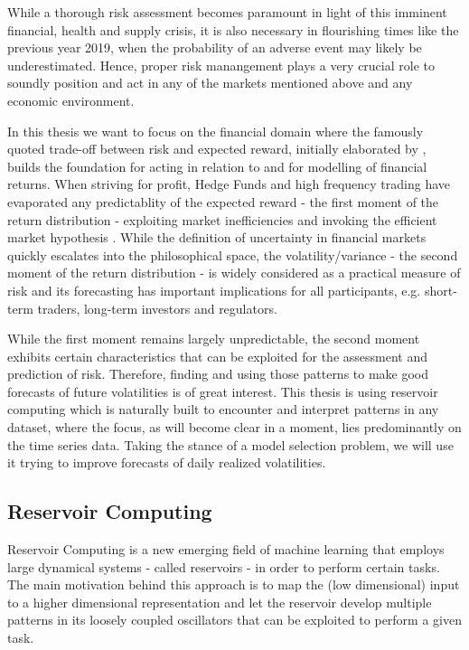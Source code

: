 While a thorough risk assessment becomes paramount in light of this imminent financial, health and supply crisis, it is also necessary in flourishing times like the previous year 2019, when the probability of an adverse event may likely be underestimated. Hence, proper risk manangement plays a very crucial role to soundly position and act in any of the markets mentioned above and any economic environment.

In this thesis we want to focus on the financial domain where the famously quoted trade-off between risk and expected reward, initially elaborated by \cite{Markowitz1952}, builds the foundation for acting in relation to and for modelling of financial returns. When striving for profit, Hedge Funds and high frequency trading have evaporated any predictablity of the expected reward - the first moment of the return distribution - exploiting market inefficiencies and invoking the efficient market hypothesis \citep{Fama1970}. While the definition of uncertainty in financial markets quickly escalates into the philosophical space, the volatility/variance - the second moment of the return distribution - is widely considered as a practical measure of risk and its forecasting has important implications for all participants, e.g. short-term traders, long-term investors and regulators. 

While the first moment remains largely unpredictable, the second moment exhibits certain characteristics that can be exploited for the assessment and prediction of risk. Therefore, finding and using those patterns to make good forecasts of future volatilities is of great interest. This thesis is using reservoir computing which is naturally built to encounter and interpret patterns in any dataset, where the focus, as will become clear in a moment, lies predominantly on the time series data. Taking the stance of a model selection problem, we will use it trying to improve forecasts of daily realized volatilities.


\subsection{Reservoir Computing}

Reservoir Computing is a new emerging field of machine learning that employs large dynamical systems - called reservoirs - in order to perform certain tasks. 
The main motivation behind this approach is to map the (low dimensional) input to a higher dimensional representation and let the reservoir develop multiple patterns in its loosely coupled oscillators that can be exploited to perform a given task.

